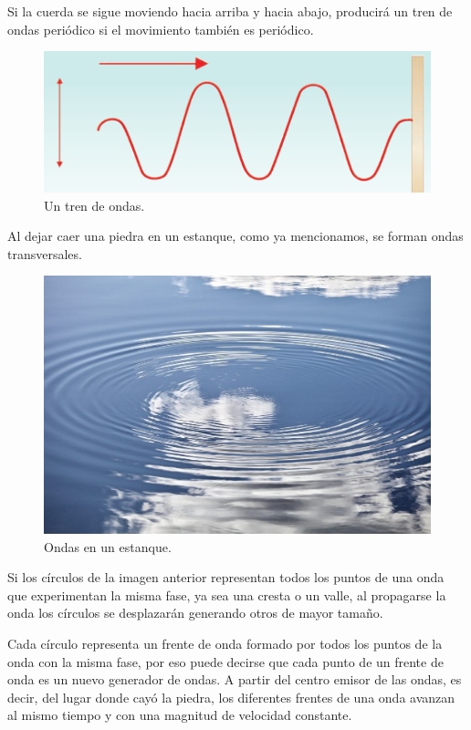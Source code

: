 \documentclass[12pt, letter]{article}
\begin{document}
Si la cuerda se sigue moviendo hacia arriba y hacia abajo, producirá un tren de ondas periódico si el movimiento también es periódico.
\begin{figure}[H]
    \centering
    \includegraphics[scale=0.8]{Imagenes/Tren_Onda_01.png}
    \caption{Un tren de ondas.}
\end{figure}
Al dejar caer una piedra en un estanque, como ya mencionamos, se forman ondas transversales.
\begin{figure}[H]
    \centering
    \includegraphics[scale=0.25]{Imagenes/Ondas_06.jpg}
    \caption{Ondas en un estanque.}
\end{figure}
Si los círculos de la imagen anterior representan todos los puntos de una onda que experimentan la misma fase, ya sea una cresta o un valle, al propagarse la onda los círculos se desplazarán generando otros de mayor tamaño. 

Cada círculo representa un frente de onda formado por todos los puntos de la onda con la misma fase,  por eso puede decirse que cada punto de un frente de onda es un nuevo generador de ondas. A partir del centro emisor de las ondas, es decir, del lugar donde cayó la piedra, los diferentes frentes de una onda avanzan al mismo tiempo y con una magnitud de velocidad constante.
\end{document}
